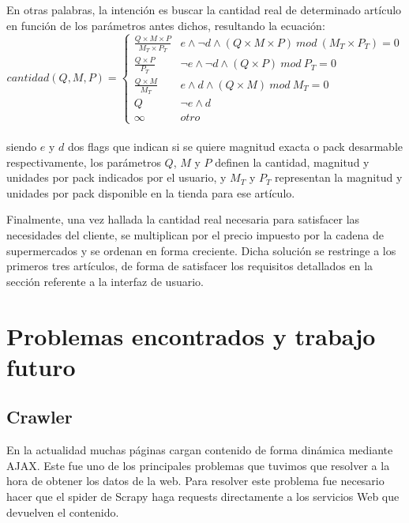 \documentclass[12pt]{article} %
\begin{document}
En otras palabras, la intención es buscar la cantidad real de determinado artículo en función de los parámetros antes dichos, resultando la ecuación:
\[
cantidad(Q,M,P) =
\begin{cases} 
\frac{Q \times M\times P}{M_T \times P_T} & e \wedge \neg d \wedge (Q \times M \times P)\ mod\ (M_T \times P_T) = 0 \\ 
\frac{Q\times P}{P_T} &  \neg e \wedge \neg d \wedge (Q\times P)\ mod\ P_T = 0 \\
\frac{Q\times M}{M_T} & e \wedge d \wedge (Q\times M)\ mod\ M_T = 0 \\
Q & \neg e \wedge d \\
\infty & otro
\end{cases}
\] 
\\siendo $e$ y $d$ dos flags que indican si se quiere magnitud exacta o pack desarmable respectivamente, los parámetros $Q$, $M$ y $P$ definen la cantidad, magnitud y unidades por pack indicados por el usuario, y $M_T$ y $P_T$ representan la magnitud y unidades por pack disponible en la tienda para ese artículo.

Finalmente, una vez hallada la cantidad real necesaria para satisfacer las necesidades del cliente, se multiplican por el precio impuesto por la cadena de supermercados y se ordenan en forma creciente. Dicha solución se restringe a los primeros tres artículos, de forma de satisfacer los requisitos detallados en la sección referente a la interfaz de usuario.


\section{Problemas encontrados y trabajo futuro}


\subsection{Crawler}

En la actualidad muchas páginas cargan contenido de forma dinámica mediante AJAX. Este fue uno de los principales problemas que tuvimos que resolver a la hora de obtener los datos de la web. Para resolver este problema fue necesario hacer que el spider de Scrapy haga requests directamente a los servicios Web que devuelven el contenido. 
\end{document}

